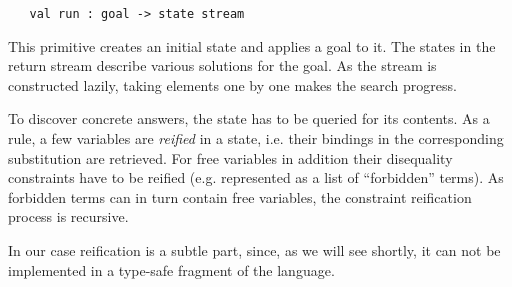 \begin{lstlisting}
   val run : goal -> state stream
\end{lstlisting}

This primitive creates an initial state and applies a goal to it. The states in the return stream describe
various solutions for the goal. As the stream is constructed lazily, taking elements one by one makes
the search progress.

To discover concrete answers, the state has to be queried for its contents. As a rule, a few variables
are \emph{reified} in a state, i.e. their bindings in the corresponding substitution are retrieved. For free
variables in addition their disequality constraints have to be reified (e.g. represented as a list of
``forbidden'' terms). As forbidden terms can in turn contain free variables, the constraint reification
process is recursive.

In our case reification is a subtle part, since, as we will see shortly, it can not be implemented in a 
type-safe fragment of the language.
